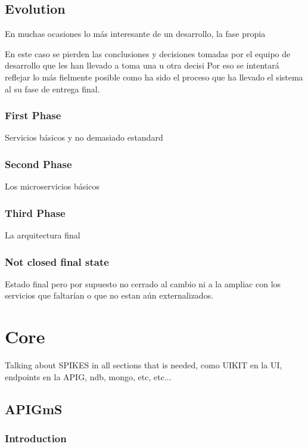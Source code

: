 \documentclass[oneside,english,titlepage]{scrbook}
\begin{document}
\section{Evolution}

En muchas ocasiones lo más interesante de un desarrollo, la fase propia

En este caso se pierden las conclusiones y decisiones tomadas por
el equipo de desarrollo que les han llevado a toma una u otra decisi
Por eso se intentará reflejar lo más fielmente posible como ha sido
el proceso que ha llevado el sistema al su fase de entrega final.

\subsection{First Phase}

Servicios básicos y no demasiado estandard

\subsection{Second Phase}

Los microservicios básicos

\subsection{Third Phase}

La arquitectura final

\subsection{Not closed final state}

Estado final pero por supuesto no cerrado al cambio ni a la ampliac
con los servicios que faltarían o que no estan aún externalizados.

\chapter{Core}

Talking about SPIKES in all sections that is needed, como UIKIT en
la UI, endpoints en la APIG, ndb, mongo, etc, etc...

\section{APIGmS}

\subsection{Introduction}
\end{document}
